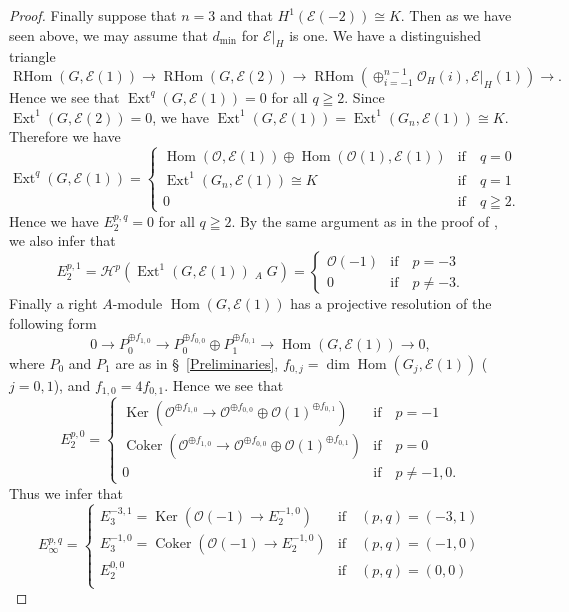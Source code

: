 \documentclass[a4paper,12pt]{amsart}
\DeclareMathOperator{\Hom}{Hom}
\DeclareMathOperator{\Ext}{Ext}
\DeclareMathOperator{\RHom}{RHom}
\DeclareMathOperator{\lotimes}{\otimes^{\mathbb{L}}}
\DeclareMathOperator{\Ker}{Ker}
\DeclareMathOperator{\Coker}{Coker}
\begin{document}
\begin{proof}
Finally suppose that $n=3$ and that $H^1(\mathcal{E}(-2))\cong K$.
Then as we have seen above, we may assume that $d_{\min}$ for $\mathcal{E}|_H$ is one.
We have a distinguished triangle
\[
\RHom(G,\mathcal{E}(1))\to \RHom(G,\mathcal{E}(2))\to \RHom(\oplus_{i=-1}^{n-1}\mathcal{O}_H(i),\mathcal{E}|_H(1))\to.
\]
Hence we see that $\Ext^{q}(G,\mathcal{E}(1))=0$ for all $q\geqq 2$.
Since $\Ext^1(G,\mathcal{E}(2))=0$, we have $\Ext^1(G,\mathcal{E}(1))=\Ext^1(G_n,\mathcal{E}(1))\cong K$.
Therefore we have 
\[\Ext^q(G,\mathcal{E}(1))=
\begin{cases}
\Hom(\mathcal{O},\mathcal{E}(1))\oplus\Hom(\mathcal{O}(1),\mathcal{E}(1))& \textrm{if}\quad  q=0\\
\Ext^{1}(G_n,\mathcal{E}(1))\cong K& \textrm{if}\quad  q= 1\\
0& \textrm{if}\quad  q\geqq 2.
\end{cases}
\]
Hence we have 
$E_2^{p,q}=0$ for all $q\geqq 2$.
By the same argument as 
in the proof of \cite[Proposition 1]{MR3275418},
we also infer that 
\[
E_2^{p,1}=\mathcal{H}^p(\Ext^1(G,\mathcal{E}(1))\lotimes_A G)
=
\begin{cases}
\mathcal{O}(-1)& \textrm{if}\quad  p= -3\\
0& \textrm{if}\quad  p\neq -3.
\end{cases}
\]
Finally 
a right $A$-module $\Hom(G,\mathcal{E}(1))$ has a projective resolution of the following form
\[
0\to P_0^{\oplus f_{1,0}}\to P_0^{\oplus f_{0,0}}\oplus P_1^{\oplus f_{0,1}}\to \Hom (G,\mathcal{E}(1))\to 0,
\]
where $P_0$ and $P_1$ are as in \S~\ref{Preliminaries},
$f_{0,j}=\dim \Hom(G_j, \mathcal{E}(1))$ ($j=0,1$), and $f_{1,0}=4f_{0,1}$.
Hence we see that
\[E_2^{p,0}=
\begin{cases}
\Ker (\mathcal{O}^{\oplus f_{1,0}}\to \mathcal{O}^{\oplus f_{0,0}}\oplus \mathcal{O}(1)^{\oplus f_{0,1}})& \textrm{if}\quad  p= -1\\
\Coker (\mathcal{O}^{\oplus f_{1,0}}\to \mathcal{O}^{\oplus f_{0,0}}\oplus \mathcal{O}(1)^{\oplus f_{0,1}})& \textrm{if}\quad  p= 0\\
0& \textrm{if}\quad p\neq -1, 0.
\end{cases}
\]
Thus we infer that
\[E_{\infty}^{p,q}=
\begin{cases}
E_3^{-3,1}=\Ker (\mathcal{O}(-1)\to E_2^{-1,0})& \textrm{if}\quad  (p,q)= (-3,1)\\
E_3^{-1,0}=\Coker (\mathcal{O}(-1)\to E_2^{-1,0})& \textrm{if}\quad  (p,q)= (-1,0)\\
E_2^{0,0}& \textrm{if}\quad (p,q)=(0,0)\\

\end{cases}\]
\end{proof}
\end{document}
